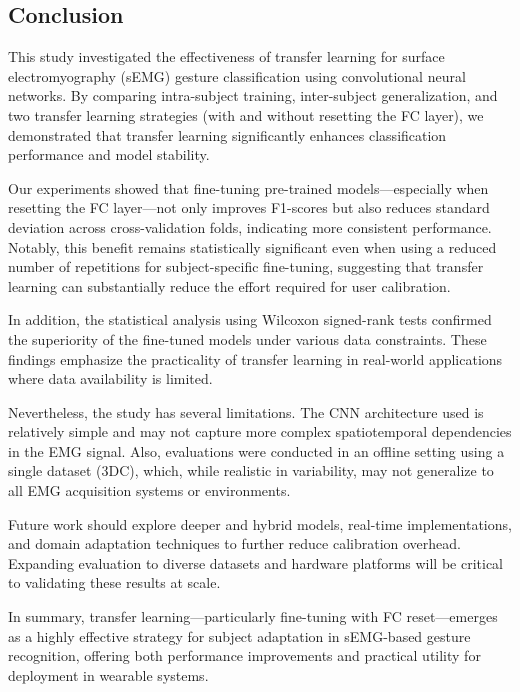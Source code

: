 \begin{multicols}{2}
\section*{Conclusion}

This study investigated the effectiveness of transfer learning for surface electromyography (sEMG) gesture classification using convolutional neural networks. By comparing intra-subject training, inter-subject generalization, and two transfer learning strategies (with and without resetting the FC layer), we demonstrated that transfer learning significantly enhances classification performance and model stability.

Our experiments showed that fine-tuning pre-trained models—especially when resetting the FC layer—not only improves F1-scores but also reduces standard deviation across cross-validation folds, indicating more consistent performance. Notably, this benefit remains statistically significant even when using a reduced number of repetitions for subject-specific fine-tuning, suggesting that transfer learning can substantially reduce the effort required for user calibration.

In addition, the statistical analysis using Wilcoxon signed-rank tests confirmed the superiority of the fine-tuned models under various data constraints. These findings emphasize the practicality of transfer learning in real-world applications where data availability is limited.

Nevertheless, the study has several limitations. The CNN architecture used is relatively simple and may not capture more complex spatiotemporal dependencies in the EMG signal. Also, evaluations were conducted in an offline setting using a single dataset (3DC), which, while realistic in variability, may not generalize to all EMG acquisition systems or environments.

Future work should explore deeper and hybrid models, real-time implementations, and domain adaptation techniques to further reduce calibration overhead. Expanding evaluation to diverse datasets and hardware platforms will be critical to validating these results at scale.

In summary, transfer learning—particularly fine-tuning with FC reset—emerges as a highly effective strategy for subject adaptation in sEMG-based gesture recognition, offering both performance improvements and practical utility for deployment in wearable systems.

\renewcommand{\refname}{References}


\end{multicols}
